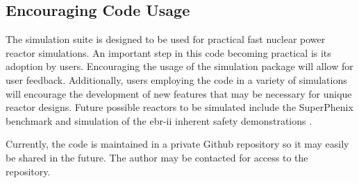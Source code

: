   \subsection{Encouraging Code Usage}
    The simulation suite is designed to be used for practical fast nuclear power
    reactor simulations. An important step in this code becoming practical is
    its adoption by users. Encouraging the usage of the simulation package will
    allow for user feedback. Additionally, users employing the code in a variety
    of simulations will encourage the development of new features that may be
    necessary for unique reactor designs. Future possible reactors to be
    simulated include the SuperPhenix benchmark and simulation of the
    \gls{ebr-ii} inherent safety demonstrations \cite{ebriitests}.
    
    \renewcommand{\thefootnote}{\fnsymbol{footnote}}
    Currently, the code is maintained in a private Github repository so it may 
    easily be shared in the future. The author may be contacted\footnotemark 
    for access to the repository. 



\glsresetall
